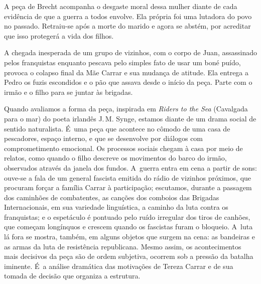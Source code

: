 A peça de Brecht acompanha o desgaste moral dessa mulher diante de cada
evidência de que a guerra a todos envolve. Ela própria foi uma lutadora
do povo no passado. Retraiu-se após a morte do marido e agora se abstém,
por acreditar que isso protegerá a vida dos filhos.

A chegada inesperada de um grupo de vizinhos, com o corpo de Juan,
assassinado pelos franquistas enquanto pescava pelo simples fato de
usar um boné puído, provoca o colapso final da Mãe Carrar e sua mudança
de atitude. Ela entrega a Pedro os fuzis escondidos e o pão que assava
desde o início da peça. Parte com o irmão e o filho para se juntar às
brigadas.

Quando avaliamos a forma da peça, inspirada em {\it Riders to the Sea}
(Cavalgada para o mar) do poeta irlandês J.\,M. Synge, estamos
diante de um drama social de sentido naturalista. É~uma peça que
acontece no cômodo de uma casa de pescadores, espaço interno, e que se
desenvolve por diálogos com comprometimento emocional. Os processos
sociais chegam à casa por meio de relatos, como quando o filho descreve
os movimentos do barco do irmão, observados através da janela dos
fundos. A~guerra entra em cena a partir de sons: ouve-se a fala de um
general fascista emitida do rádio de vizinhos próximos, que procuram
forçar a família Carrar à participação; escutamos, durante a passagem
dos caminhões de combatentes, as canções dos comboios das Brigadas
Internacionais, em sua variedade linguística, a caminho da luta contra
os franquistas; e o espetáculo é pontuado pelo ruído irregular dos tiros
de canhões, que começam longínquos e crescem quando os fascistas furam o
bloqueio. A~luta lá fora se mostra, também, em alguns objetos que surgem
na cena: as bandeiras e as armas da luta de resistência republicana.
Mesmo assim, os acontecimentos mais decisivos da peça são de ordem
subjetiva, ocorrem sob a pressão da batalha iminente. É~a análise
dramática das motivações de Tereza Carrar e de sua tomada de decisão que
organiza a estrutura.

